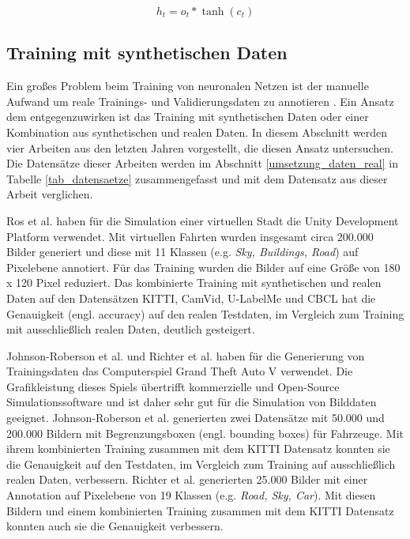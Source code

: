 \begin{equation}
h_t = o_t * \tanh(c_t)
\end{equation}


\subsection{Training mit synthetischen Daten}
\label{grundlagen_nn_synthetisch}

Ein großes Problem beim Training von neuronalen Netzen ist der manuelle Aufwand um reale Trainings- und Validierungsdaten zu annotieren \cite{richter2016playing}. Ein Ansatz dem entgegenzuwirken ist das Training mit synthetischen Daten oder einer Kombination aus synthetischen und realen Daten. In diesem Abschnitt werden vier Arbeiten aus den letzten Jahren vorgestellt, die diesen Ansatz untersuchen. Die Datensätze dieser Arbeiten werden im Abschnitt \ref{umsetzung_daten_real} in Tabelle \ref{tab_datensaetze} zusammengefasst und mit dem Datensatz aus dieser Arbeit verglichen.

Ros et al. \cite{ros2016synthia} haben für die Simulation einer virtuellen Stadt die Unity Development Platform verwendet. Mit virtuellen Fahrten wurden insgesamt circa 200.000 Bilder generiert und diese mit 11 Klassen (e.g. \textit{Sky, Buildings, Road}) auf Pixelebene annotiert. Für das Training wurden die Bilder auf eine Größe von 180 x 120 Pixel reduziert. Das kombinierte Training mit synthetischen und realen Daten auf den Datensätzen KITTI, CamVid, U-LabelMe und CBCL hat die Genauigkeit (engl. accuracy) auf den realen Testdaten, im Vergleich zum Training mit ausschließlich realen Daten, deutlich gesteigert.

Johnson-Roberson et al. \cite{johnson2017driving} und Richter et al. \cite{richter2016playing} haben für die Generierung von Trainingsdaten das Computerspiel Grand Theft Auto V verwendet. Die Grafikleistung dieses Spiels übertrifft kommerzielle und Open-Source Simulationssoftware und ist daher sehr gut für die Simulation von Bilddaten geeignet. Johnson-Roberson et al. \cite{johnson2017driving} generierten zwei Datensätze mit 50.000 und 200.000 Bildern mit Begrenzungsboxen (engl. bounding boxes) für Fahrzeuge. Mit ihrem kombinierten Training zusammen mit dem KITTI Datensatz konnten sie die Genauigkeit auf den Testdaten, im Vergleich zum Training auf ausschließlich realen Daten, verbessern. Richter et al. \cite{richter2016playing} generierten 25.000 Bilder mit einer Annotation auf Pixelebene von 19 Klassen (e.g. \textit{Road, Sky, Car}). Mit diesen Bildern und einem kombinierten Training zusammen mit dem KITTI Datensatz konnten auch sie die Genauigkeit verbessern.

